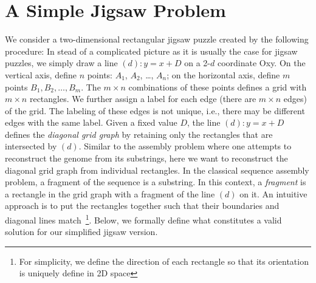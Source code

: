 \documentclass[a4paper]{article}
\begin{document}
\section{A Simple Jigsaw Problem}

We consider a two-dimensional rectangular jigsaw puzzle created by the following procedure:
In stead of a complicated picture as it is usually the case for jigsaw puzzles, we simply draw a line $(d): y = x + D$ on a 2-$d$ coordinate Oxy.
On the vertical axis, define $n$ points: $A_1$, $A_2$, \ldots, $A_n$; on the horizontal axis, define $m$ points
$B_1, B_2, \ldots, B_m$. The $m\times n$ combinations of these points defines a grid with $m\times n$ rectangles.  We further assign a label for each edge (there are
$m\times n$ edges) of the grid. The labeling of these edges is not unique, i.e., there may be different edges with the same label. 
Given a fixed value $D$,  the line $(d): y = x + D$ defines the \emph{diagonal grid graph} by retaining only the rectangles that are intersected by $(d)$.
Similar to the assembly problem where one attempts to reconstruct the genome from its
substrings, here we want to reconstruct the diagonal grid graph from individual rectangles.
In the classical sequence assembly problem, a fragment of the sequence is a substring. In this context, a \emph{fragment} is a
rectangle in the grid graph with a fragment of the line $(d)$ on it. 
An intuitive approach is to put the rectangles together such that their boundaries and diagonal lines match~\footnote{
For simplicity, we define the direction of each rectangle so that its orientation
is uniquely define in 2D space}. Below, we formally define what constitutes
a valid solution for our simplified jigsaw version.
\end{document}
